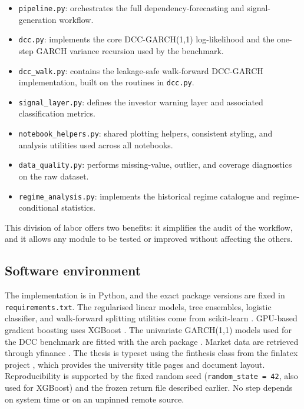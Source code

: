 \begin{itemize}
    \item \texttt{pipeline.py}: orchestrates the full dependency-forecasting and signal-generation workflow.
    \item \texttt{dcc.py}: implements the core DCC-GARCH(1,1) log-likelihood and the one-step GARCH variance recursion used by the benchmark.
    \item \texttt{dcc\_walk.py}: contains the leakage-safe walk-forward DCC-GARCH implementation, built on the routines in \texttt{dcc.py}.
    \item \texttt{signal\_layer.py}: defines the investor warning layer and associated classification metrics.
    \item \texttt{notebook\_helpers.py}: shared plotting helpers, consistent styling, and analysis utilities used across all notebooks.
    \item \texttt{data\_quality.py}: performs missing-value, outlier, and coverage diagnostics on the raw dataset.
    \item \texttt{regime\_analysis.py}: implements the historical regime catalogue and regime-conditional statistics.
\end{itemize}

This division of labor offers two benefits: it simplifies the audit of the workflow, and it allows any module to be tested or improved without affecting the others.

\subsection{Software environment}

The implementation is in Python, and the exact package versions are fixed in \texttt{requirements.txt}. The regularised linear models, tree ensembles, logistic classifier, and walk-forward splitting utilities come from scikit-learn \cite{sklearn2026}. GPU-based gradient boosting uses XGBoost \cite{xgboostdocs2026}. The univariate GARCH(1,1) models used for the DCC benchmark are fitted with the arch package \cite{archdocs2026}. Market data are retrieved through yfinance \cite{yfinance2026}. The thesis is typeset using the finthesis class from the finlatex project \cite{finlatex2026}, which provides the university title pages and document layout. Reproducibility is supported by the fixed random seed (\texttt{random\_state = 42}, also used for XGBoost) and the frozen return file described earlier. No step depends on system time or on an unpinned remote source.

